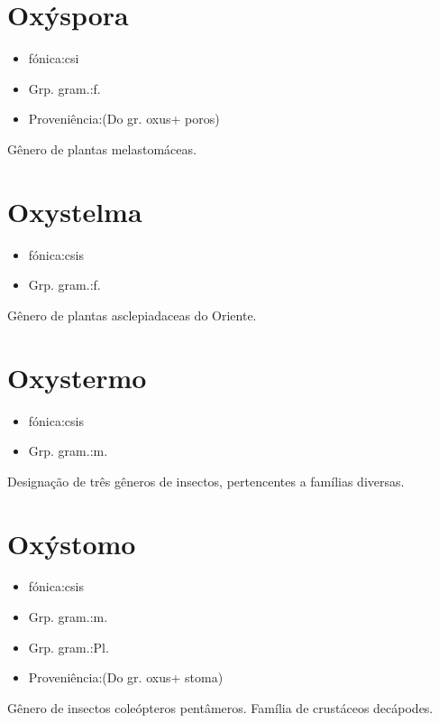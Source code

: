 \section{Oxýspora}
\begin{itemize}
\item {fónica:csi}
\end{itemize}
\begin{itemize}
\item {Grp. gram.:f.}
\end{itemize}
\begin{itemize}
\item {Proveniência:(Do gr. \textunderscore oxus\textunderscore  + \textunderscore poros\textunderscore )}
\end{itemize}
Gênero de plantas melastomáceas.
\section{Oxystelma}
\begin{itemize}
\item {fónica:csis}
\end{itemize}
\begin{itemize}
\item {Grp. gram.:f.}
\end{itemize}
Gênero de plantas asclepiadaceas do Oriente.
\section{Oxystermo}
\begin{itemize}
\item {fónica:csis}
\end{itemize}
\begin{itemize}
\item {Grp. gram.:m.}
\end{itemize}
Designação de três gêneros de insectos, pertencentes a famílias diversas.
\section{Oxýstomo}
\begin{itemize}
\item {fónica:csis}
\end{itemize}
\begin{itemize}
\item {Grp. gram.:m.}
\end{itemize}
\begin{itemize}
\item {Grp. gram.:Pl.}
\end{itemize}
\begin{itemize}
\item {Proveniência:(Do gr. \textunderscore oxus\textunderscore  + \textunderscore stoma\textunderscore )}
\end{itemize}
Gênero de insectos coleópteros pentâmeros.
Família de crustáceos decápodes.
